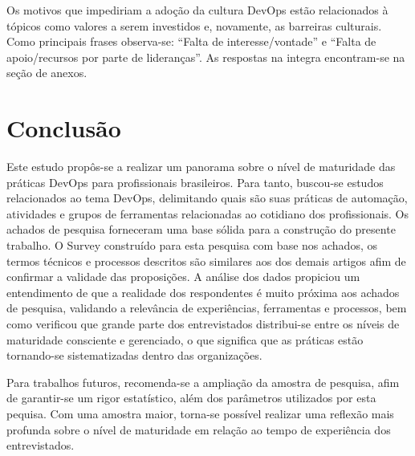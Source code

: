\documentclass[twoside,english,brazilian]{UNISINOSartigo}
\begin{document}
Os motivos que impediriam a adoção da cultura DevOps estão relacionados à tópicos como valores a serem investidos e, novamente, as barreiras culturais. Como principais frases observa-se: ``Falta de interesse/vontade'' e ``Falta de apoio/recursos por parte de lideranças''. As respostas na integra encontram-se na seção de anexos.


\section{Conclusão}
Este estudo propôs-se a realizar um panorama sobre o nível de maturidade das práticas DevOps para profissionais brasileiros. Para tanto, buscou-se estudos relacionados ao tema DevOps, delimitando quais são suas práticas de automação, atividades e grupos de ferramentas relacionadas ao cotidiano dos profissionais. Os achados de pesquisa forneceram uma base sólida para a construção do presente trabalho. O Survey construído para esta pesquisa com base nos achados, os termos técnicos e processos descritos são similares aos dos demais artigos afim de confirmar a validade das proposições. A análise dos dados propiciou um entendimento de que a realidade dos respondentes é muito próxima aos achados de pesquisa, validando a relevância de experiências, ferramentas e processos, bem como verificou que grande parte dos entrevistados distribui-se entre os níveis de maturidade consciente e gerenciado, o que significa que as práticas estão tornando-se sistematizadas dentro das organizações.

Para trabalhos futuros, recomenda-se a ampliação da amostra de pesquisa, afim de garantir-se um rigor estatístico, além dos parâmetros utilizados por esta pequisa. Com uma amostra maior, torna-se possível realizar uma reflexão mais profunda sobre o nível de maturidade em relação ao tempo de experiência dos entrevistados.

%





\end{document}
